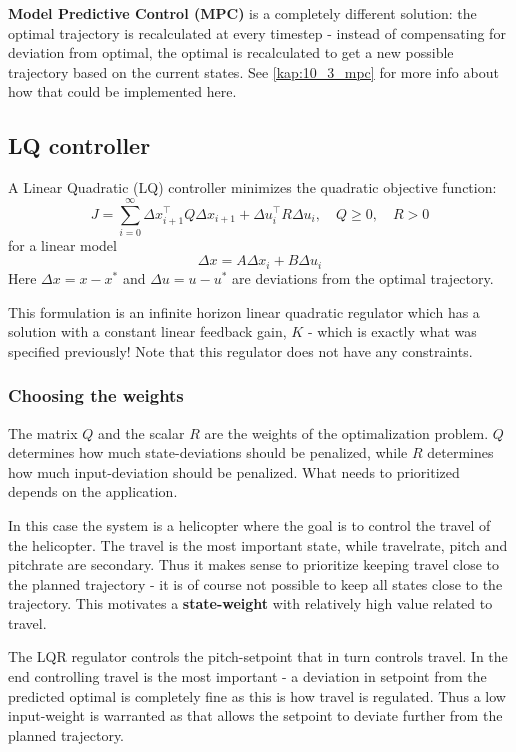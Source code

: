 \documentclass[../main.tex]{subfiles}
\begin{document}
\textbf{Model Predictive Control (MPC)} is a completely different solution: the optimal trajectory is recalculated at every timestep - instead of compensating for deviation from optimal, the optimal is recalculated to get a new possible trajectory based on the current states. See \cref{kap:10_3_mpc} for more info about how that could be implemented here.

\subsection{LQ controller} \label{kap:task_10_3_LQ_controller}
A Linear Quadratic (LQ) controller minimizes the quadratic objective function:
\begin{equation}
    J = \sum^\infty_{i=0} \Delta x_{i+1}^\top Q \Delta x_{i+1} + \Delta u_i^\top R \Delta u_i, \quad Q \ge0, \quad R > 0
\end{equation}
for a linear model
\begin{equation}\label{eq:lab3_lin_model}
	\Delta x=A\Delta x_i + B \Delta u_i
\end{equation}
Here $ \Delta x = x - x^*$ and $\Delta u = u - u^*$ are deviations from the optimal trajectory.

This formulation is an infinite horizon linear quadratic regulator which has a solution with a constant linear feedback gain, $K$ - which is exactly what was specified previously! Note that this regulator does not have any constraints.

\subsubsection{Choosing the weights}
The matrix $Q$ and the scalar $R$ are the weights of the optimalization problem. $Q$ determines how much state-deviations should be penalized, while $R$ determines how much input-deviation should be penalized. What needs to prioritized depends on the application.

In this case the system is a helicopter where the goal is to control the travel of the helicopter. The travel is the most important state, while travelrate, pitch and pitchrate are secondary. Thus it makes sense to prioritize keeping travel close to the planned trajectory - it is of course not possible to keep all states close to the trajectory. This motivates a \textbf{state-weight} with relatively high value related to travel.

The LQR regulator controls the pitch-setpoint that in turn controls travel. In the end controlling travel is the most important - a deviation in setpoint from the predicted optimal is completely fine as this is how travel is regulated. Thus a low input-weight is warranted as that allows the setpoint to deviate further from the planned trajectory.
\end{document}
